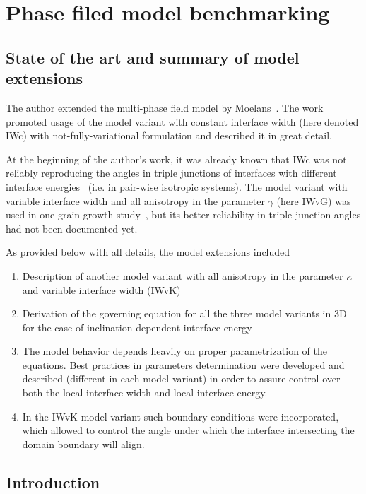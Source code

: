 \chapter{Phase filed model benchmarking}

\section{State of the art and summary of model extensions}
The author extended the multi-phase field model by Moelans~\cite{Moelans2008}. The work~\cite{Moelans2008} promoted usage of the model variant with constant interface width (here denoted IWc) with not-fully-variational formulation and described it in great detail.

At the beginning of the author's work, it was already known that IWc was not reliably reproducing the angles in triple junctions of interfaces with different interface energies~\cite{Moelans2010_thinfilm} (i.e. in pair-wise isotropic systems). The model variant with variable interface width and all anisotropy in the parameter $\gamma$ (here IWvG) was used in one grain growth study~\cite{Ravash2017}, but its better reliability in triple junction angles had not been documented yet.

As provided below with all details, the model extensions included
\begin{enumerate}
	\item Description of another model variant with all anisotropy in the parameter $\kappa$ and variable interface width (IWvK)
	\item Derivation of the governing equation for all the three model variants in 3D for the case of inclination-dependent interface energy
	\item The model behavior depends heavily on proper parametrization of the equations. Best practices in parameters determination were  developed and described (different in each model variant) in order to assure control over both the local interface width and local interface energy. 
	\item In the IWvK model variant such boundary conditions were incorporated, which allowed to control the angle under which the interface intersecting the domain boundary will align.
\end{enumerate}

\section{Introduction}
\label{sec_P1_Intro}

